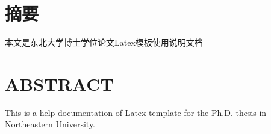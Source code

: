 \chapter[摘\quad 要]{摘\quad 要}%
\linespread{1.5}

本文是东北大学博士学位论文Latex模板使用说明文档

\chapter{\bf{ABSTRACT}}%

This is a help documentation of Latex template for the Ph.D. thesis in Northeastern University.

